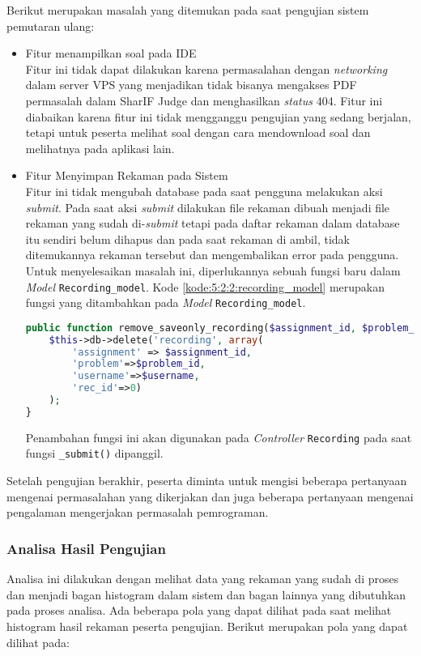 Berikut merupakan masalah yang ditemukan pada saat pengujian sistem pemutaran ulang:

\begin{itemize}
    \item Fitur menampilkan soal pada IDE \\
    Fitur ini tidak dapat dilakukan karena permasalahan dengan \textit{networking} dalam server VPS yang menjadikan tidak bisanya mengakses PDF permasalah dalam SharIF Judge dan menghasilkan \textit{status} 404. Fitur ini diabaikan karena fitur ini tidak mengganggu pengujian yang sedang berjalan, tetapi untuk peserta melihat soal dengan cara mendownload soal dan melihatnya pada aplikasi lain. 
    \item Fitur Menyimpan Rekaman pada Sistem \\
    Fitur ini tidak mengubah database pada saat pengguna melakukan aksi \textit{submit}. Pada saat aksi \textit{submit} dilakukan file rekaman dibuah menjadi file rekaman yang sudah di-\textit{submit} tetapi pada daftar rekaman dalam database itu sendiri belum dihapus dan pada saat rekaman di ambil, tidak ditemukannya rekaman tersebut dan mengembalikan error pada pengguna. Untuk menyelesaikan masalah ini, diperlukannya sebuah fungsi baru dalam \textit{Model} \verb|Recording_model|. Kode \ref{kode:5:2:2:recording_model} merupakan fungsi yang ditambahkan pada \textit{Model} \verb|Recording_model|. 

    \begin{lstlisting}[language=php, caption={Fungsi tambahan pada \textit{Recording model}}, label=kode:5:2:2:recording_model]
public function remove_saveonly_recording($assignment_id, $problem_id, $username) {
    $this->db->delete('recording', array(
        'assignment' => $assignment_id, 
        'problem'=>$problem_id, 
        'username'=>$username, 
        'rec_id'=>0)
    );
}
    \end{lstlisting}

    Penambahan fungsi ini akan digunakan pada \textit{Controller} \verb|Recording| pada saat fungsi \verb|_submit()| dipanggil.

\end{itemize}

Setelah pengujian berakhir, peserta diminta untuk mengisi beberapa pertanyaan mengenai permasalahan yang dikerjakan dan juga beberapa pertanyaan mengenai pengalaman mengerjakan permasalah pemrograman. 

\subsubsection{Analisa Hasil Pengujian}
Analisa ini dilakukan dengan melihat data yang rekaman yang sudah di proses dan menjadi bagan histogram dalam sistem dan bagan lainnya yang dibutuhkan pada proses analisa. Ada beberapa pola yang dapat dilihat pada saat melihat histogram hasil rekaman peserta pengujian. Berikut merupakan pola yang dapat dilihat pada:

